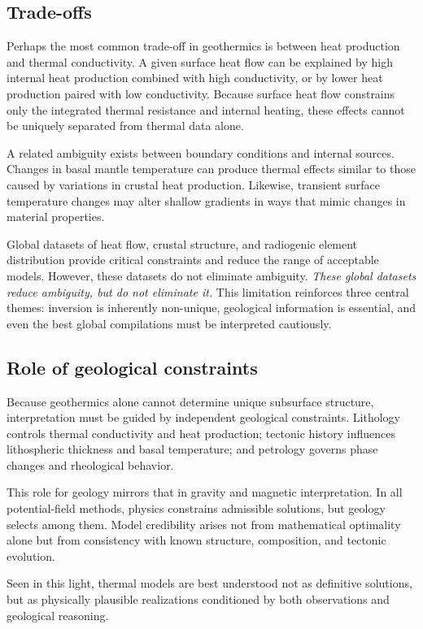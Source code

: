 \subsection{Trade-offs}

Perhaps the most common trade-off in geothermics is between heat production and thermal conductivity. A given surface heat flow can be explained by high internal heat production combined with high conductivity, or by lower heat production paired with low conductivity. Because surface heat flow constrains only the integrated thermal resistance and internal heating, these effects cannot be uniquely separated from thermal data alone.

A related ambiguity exists between boundary conditions and internal sources. Changes in basal mantle temperature can produce thermal effects similar to those caused by variations in crustal heat production. Likewise, transient surface temperature changes may alter shallow gradients in ways that mimic changes in material properties.

Global datasets of heat flow, crustal structure, and radiogenic element distribution provide critical constraints and reduce the range of acceptable models. However, these datasets do not eliminate ambiguity. \emph{These global datasets reduce ambiguity, but do not eliminate it.} This limitation reinforces three central themes: inversion is inherently non-unique, geological information is essential, and even the best global compilations must be interpreted cautiously.

\subsection{Role of geological constraints}

Because geothermics alone cannot determine unique subsurface structure, interpretation must be guided by independent geological constraints. Lithology controls thermal conductivity and heat production; tectonic history influences lithospheric thickness and basal temperature; and petrology governs phase changes and rheological behavior.

This role for geology mirrors that in gravity and magnetic interpretation. In all potential-field methods, physics constrains admissible solutions, but geology selects among them. Model credibility arises not from mathematical optimality alone but from consistency with known structure, composition, and tectonic evolution.

Seen in this light, thermal models are best understood not as definitive solutions, but as physically plausible realizations conditioned by both observations and geological reasoning.

